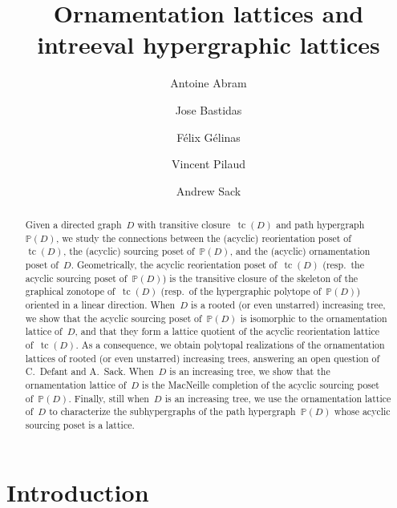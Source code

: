 \documentclass{amsart}
\title[Ornamentation lattices and intreeval hypergraphic lattices]{Ornamentation lattices and \\ intreeval hypergraphic lattices}
\author{Antoine Abram}
\author{Jose Bastidas}
\author{F\'elix G\'elinas}
\author{Vincent Pilaud}
\author{Andrew Sack}
\theoremstyle{definition}
\DeclareMathOperator{\tc}{tc} %
\newcommand{\PP}{\mathbb P} %
\begin{document}
\begin{abstract}
Given a directed graph~$D$ with transitive closure~$\tc(D)$ and path hypergraph~$\PP(D)$, we study the connections between the (acyclic) reorientation poset of~$\tc(D)$, the (acyclic) sourcing poset of~$\PP(D)$, and the (acyclic) ornamentation poset of~$D$.
Geometrically, the acyclic reorientation poset of~$\tc(D)$ (resp.~the acyclic sourcing poset of~$\PP(D)$) is the transitive closure of the skeleton of the graphical zonotope of~$\tc(D)$ (resp.~of the hypergraphic polytope of~$\PP(D)$) oriented in a linear direction.
When~$D$ is a rooted (or even unstarred) increasing tree, we show that the acyclic sourcing poset of~$\PP(D)$ is isomorphic to the ornamentation lattice of~$D$, and that they form a lattice quotient of the acyclic reorientation lattice of~$\tc(D)$.
As a consequence, we obtain polytopal realizations of the ornamentation lattices of rooted (or even unstarred) increasing trees, answering an open question of C.~Defant and A.~Sack.
When~$D$ is an increasing tree, we show that the ornamentation lattice of~$D$ is the MacNeille completion of the acyclic sourcing poset of~$\PP(D)$.
Finally, still when~$D$ is an increasing tree, we use the ornamentation lattice of~$D$ to characterize the subhypergraphs of the path hypergraph~$\PP(D)$ whose acyclic sourcing poset is a lattice.
\end{abstract}

\vspace*{-1cm}
\maketitle

\tableofcontents
\vspace*{-1cm}


\section{Introduction}
\label{sec:introduction}


\end{document}
